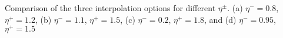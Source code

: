 Comparison of the three interpolation options for different $\eta^\pm$.  (a) $\eta^-=0.8$, $\eta^+=1.2$, (b) $\eta^-=1.1$, $\eta^+=1.5$, (c) $\eta^-=0.2$, $\eta^+=1.8$, and (d) $\eta^-=0.95$, $\eta^+=1.5$